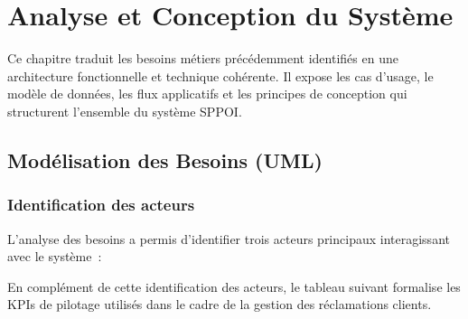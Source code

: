 \documentclass[10pt,a4paper]{report}
\newcommand{\chapintro}[1]{%
  \begin{tcolorbox}[introbox]
    #1
  \end{tcolorbox}%
  \vspace{8pt}%
}
\begin{document}
\chapter{Analyse et Conception du Système}

\chapintro{%
Ce chapitre traduit les besoins métiers précédemment identifiés en une architecture fonctionnelle et technique cohérente. Il expose les cas d'usage, le modèle de données, les flux applicatifs et les principes de conception qui structurent l'ensemble du système SPPOI.%
}


\section{Modélisation des Besoins (UML)}

\subsection{Identification des acteurs}

L'analyse des besoins a permis d'identifier trois acteurs principaux interagissant avec le système~:

En complément de cette identification des acteurs, le tableau suivant formalise les KPIs de pilotage utilisés dans le cadre de la gestion des réclamations clients.
\end{document}
